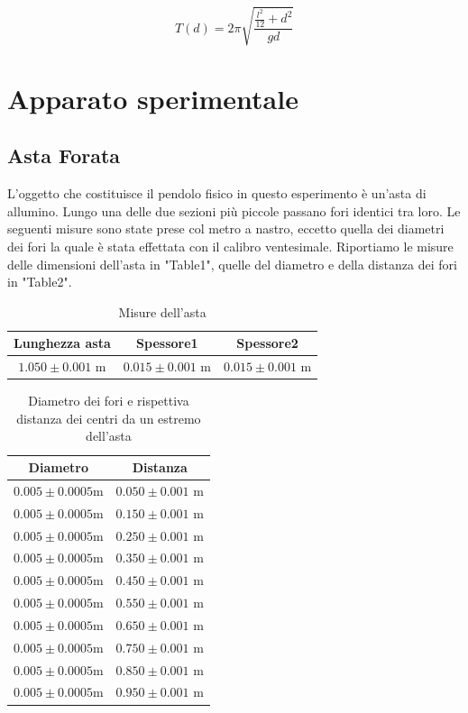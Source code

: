 \documentclass[11pt]{article}
\begin{document}
\begin{equation}
T(d)=2\pi\sqrt{\frac{\frac{l^2}{12}+d^2}{gd}}
\end{equation}

\section{Apparato sperimentale}
\subsection{Asta Forata}
L'oggetto che costituisce il pendolo fisico in questo esperimento è un'asta di allumino.
Lungo  una delle due sezioni più piccole passano fori identici  tra loro.
Le seguenti misure sono state prese col metro a nastro, eccetto quella dei diametri dei fori la quale è  stata effettata con il calibro ventesimale.
Riportiamo le misure delle dimensioni dell'asta in "Table1", quelle del diametro e della distanza dei fori in "Table2".
\begin{table}
\centering

\caption{Misure dell'asta}
\begin{tabular}[t]{|c|c|c|}
 Lunghezza asta &Spessore1&Spessore2\\
  \hline
  $1.050 \pm 0.001$ m & $0.015 \pm 0.001$ m & $0.015 \pm 0.001$ m \\
\end{tabular}

\end{table}


\begin{table}
    \centering
\caption{Diametro dei fori e rispettiva distanza dei centri da un estremo dell'asta}
    \label{tab:lunghezza-asta}
    \begin{tabular}{|c|c|}
        \hline
        Diametro & Distanza\\
        \hline
         $0.005 \pm 0.0005$m & $0.050 \pm 0.001$ m \\
        $0.005 \pm 0.0005$m & $0.150 \pm 0.001$ m \\
        $0.005 \pm 0.0005$m & $0.250\pm 0.001$ m \\
        $0.005 \pm 0.0005$m & $0.350 \pm 0.001$ m \\
        $0.005 \pm 0.0005$m & $0.450 \pm 0.001$ m \\
        $0.005 \pm 0.0005$m  & $0.550 \pm 0.001$ m \\
        $0.005 \pm 0.0005$m & $0.650 \pm 0.001$ m \\
       $0.005 \pm 0.0005$m & $0.750 \pm 0.001$ m \\
       $0.005 \pm 0.0005$m & $0.850 \pm 0.001$ m \\
        $0.005 \pm 0.0005$m & $0.950 \pm 0.001$ m \\
        \hline
    \end{tabular}
\end{table}
\end{document}
